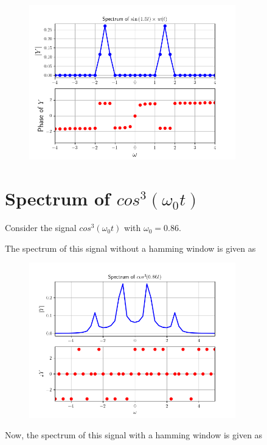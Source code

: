\documentclass[12pt, a4paper]{article}
\begin{document}
\begin{figure}[H]
\centering
\includegraphics[width=0.8\textwidth]{ex7_2.png}
\end{figure}

\section{Spectrum of $cos^3(\omega_0 t)$}

Consider the signal $cos^3(\omega_0 t)$ with $\omega_0 = 0.86$.

The spectrum of this signal without a hamming window is given as 

\begin{figure}[H]
\centering
\includegraphics[width=0.8\textwidth]{q2_1.png}
\end{figure}

Now, the spectrum of this signal with a hamming window is given as
\end{document}
